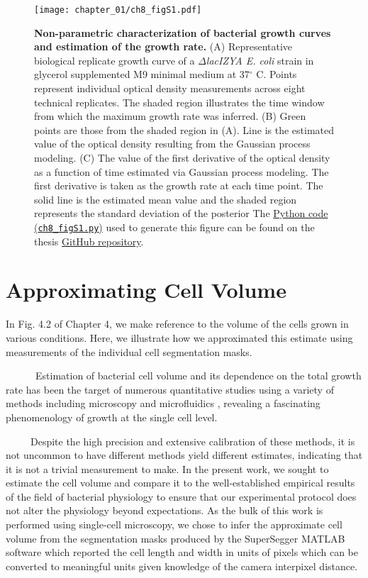 \documentclass[12pt]{caltech_thesis}
\begin{document}
\hypertarget{fig:gp_growth_curve}{%
\begin{figure}
\centering
\texttt{[image: chapter\_01/ch8\_figS1.pdf]}
\caption[{Non-parametric estimation of maximum growth rate from
bacterial growth curves.}]{\textbf{Non-parametric characterization of
bacterial growth curves and estimation of the growth rate.} (A)
Representative biological replicate growth curve of a
\(\Delta\)\emph{lacIZYA E. coli} strain in glycerol supplemented M9
minimal medium at 37\(^\circ\) C. Points represent individual optical
density measurements across eight technical replicates. The shaded
region illustrates the time window from which the maximum growth rate
was inferred. (B) Green points are those from the shaded region in (A).
Line is the estimated value of the optical density resulting from the
Gaussian process modeling. (C) The value of the first derivative of the
optical density as a function of time estimated via Gaussian process
modeling. The first derivative is taken as the growth rate at each time
point. The solid line is the estimated mean value and the shaded region
represents the standard deviation of the posterior The
\href{https://github.com/gchure/phd/blob/master/src/chapter_08/code/ch8_figS1.py}{Python
code (\texttt{ch8\_figS1.py})} used to generate this figure can be found
on the thesis \href{https://github.com/gchure/phd}{GitHub repository}.}
\label{fig:gp_growth_curve}
\end{figure}
}

\hypertarget{approximating-cell-volume}{%
\section{Approximating Cell Volume}\label{approximating-cell-volume}}

In Fig. 4.2 of Chapter 4, we make reference to the volume of the cells
grown in various conditions. Here, we illustrate how we approximated
this estimate using measurements of the individual cell segmentation
masks.

~~~~~~Estimation of bacterial cell volume and its dependence on the
total growth rate has been the target of numerous quantitative studies
using a variety of methods including microscopy
\autocite{pilizota2012,pilizota2014,taheri-araghi2015,schmidt2016,schaechter1958}
and microfluidics \autocite{kubitschek1986}, revealing a fascinating
phenomenology of growth at the single cell level.

~~~~~Despite the high precision and extensive calibration of these
methods, it is not uncommon to have different methods yield different
estimates, indicating that it is not a trivial measurement to make. In
the present work, we sought to estimate the cell volume and compare it
to the well-established empirical results of the field of bacterial
physiology to ensure that our experimental protocol does not alter the
physiology beyond expectations. As the bulk of this work is performed
using single-cell microscopy, we chose to infer the approximate cell
volume from the segmentation masks produced by the SuperSegger MATLAB
software \autocite{stylianidou2016} which reported the cell length and
width in units of pixels which can be converted to meaningful units
given knowledge of the camera interpixel distance.
\end{document}
